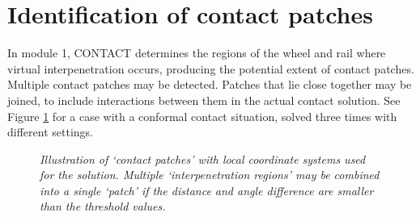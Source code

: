 \documentclass[12pt]{report}
\begin{document}
\section{Identification of contact patches}
\label{sec:cpatches}

In module 1, CONTACT determines the regions of the wheel and rail where
virtual interpenetration occurs, producing the potential extent of 
contact patches. Multiple contact patches may be detected. Patches that lie
close together may be joined, to include interactions between them in the
actual contact solution. See Figure \ref{fig:site_b_cpatch} for a case with
a conformal contact situation, solved three times with different settings.

\begin{figure}[bt]
\centering
{}
\caption{\em Illustration of `contact patches' with local coordinate
        systems used for the solution. Multiple `interpenetration regions'
        may be combined into a single `patch' if the distance and angle
        difference are smaller than the threshold values.}
\label{fig:site_b_cpatch}
\end{figure}
\end{document}
